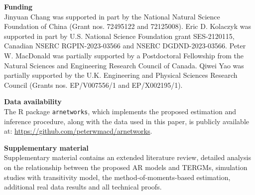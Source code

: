 \documentclass[12pt]{article}
\newcommand{\0}{{\bf 0}}
\begin{document}
\bigskip 




\bigskip

\noindent
{\bf Funding} \\
Jinyuan Chang was supported in part by the National Natural Science Foundation of China (Grant nos. 72495122 and 72125008). Eric D. Kolaczyk was supported in part by U.S. National Science Foundation grant SES-2120115, Canadian NSERC RGPIN-2023-03566 and NSERC DGDND-2023-03566. Peter W. MacDonald was partially supported by a Postdoctoral Fellowship from the Natural Sciences and Engineering Research Council of Canada. Qiwei Yao was partially supported by the U.K. Engineering and Physical Sciences Research Council (Grants nos. EP/V007556/1 and EP/X002195/1). 

\bigskip

\noindent
{\bf Data availability}\\
The R package \texttt{arnetworks}, which implements the proposed estimation and inference procedure, along with the data used in this paper, is publicly available at: \url{https://github.com/peterwmacd/arnetworks}.

\bigskip

\noindent
{\bf Supplementary material}\\
Supplementary material 
contains an extended literature review, detailed analysis on the relationship
between the proposed AR models and TERGMs, simulation studies with transitivity model, the method-of-moments-based estimation, additional real data results and all technical proofs.



\end{document}
